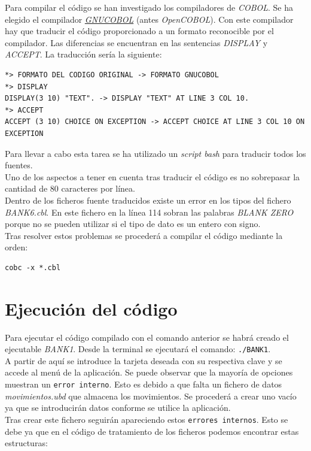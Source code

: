 \documentclass[10pt,a4paper]{article}
\begin{document}
Para compilar el código se han investigado los compiladores de \emph{COBOL}. Se ha elegido el compilador \href{https://sourceforge.net/projects/gnucobol/}{\emph{GNUCOBOL}} (antes \emph{OpenCOBOL}). Con este compilador hay que traducir el código proporcionado a un formato reconocible por el compilador. Las diferencias se encuentran en las sentencias \emph{DISPLAY} y \emph{ACCEPT}. La traducción sería la siguiente:

\begin{lstlisting}
*> FORMATO DEL CODIGO ORIGINAL -> FORMATO GNUCOBOL
*> DISPLAY
DISPLAY(3 10) "TEXT". -> DISPLAY "TEXT" AT LINE 3 COL 10.
*> ACCEPT 
ACCEPT (3 10) CHOICE ON EXCEPTION -> ACCEPT CHOICE AT LINE 3 COL 10 ON EXCEPTION
\end{lstlisting}

Para llevar a cabo esta tarea se ha utilizado un \emph{script bash} para traducir todos los fuentes.\\

Uno de los aspectos a tener en cuenta tras traducir el código es no sobrepasar la cantidad de 80 caracteres por línea.\\

Dentro de los ficheros fuente traducidos existe un error en los tipos del fichero \emph{BANK6.cbl}. En este fichero en la línea 114 sobran las palabras \emph{BLANK ZERO} porque no se pueden utilizar si el tipo de dato es un entero con signo.\\

Tras resolver estos problemas se procederá a compilar el código mediante la orden:

\begin{lstlisting}
cobc -x *.cbl
\end{lstlisting}

\section{Ejecución del código}

Para ejecutar el código compilado con el comando anterior se habrá creado el ejecutable \emph{BANK1}. Desde la terminal se ejecutará el comando: \texttt{./BANK1}.\\

A partir de aquí se introduce la tarjeta deseada con su respectiva clave y se accede al menú de la aplicación. Se puede observar que la mayoría de opciones muestran un \texttt{error interno}. Esto es debido a que falta un fichero de datos \emph{movimientos.ubd} que almacena los movimientos. Se procederá a crear uno vacío ya que se introducirán datos conforme se utilice la aplicación.\\
Tras crear este fichero seguirán apareciendo estos \texttt{errores internos}. Esto se debe ya que en el código de tratamiento de los ficheros podemos encontrar estas estructuras:
\end{document}
